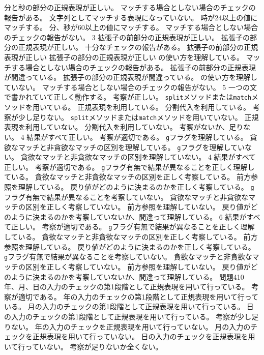 {{	{分と秒の部分の正規表現が正しい。}
	{マッチする場合としない場合のチェックの報告がある。}
	}
	{
  {文字列としてマッチする表現になっていない。}
	{時が24以上の値にマッチする。}
	{分、秒が60以上の値にマッチする。}
	{マッチする場合としない場合のチェックの報告がない。}
	}
	{}{3}
	{
	{拡張子の前部分の正規表現が正しい。}
	{拡張子の部分の正規表現が正しい。}
	{十分なチェックの報告がある。}
	}
	{
	{拡張子の前部分の正規表現が正しい}
	{拡張子の部分の正規表現が正しい}
	{{\bfseries\textdollar}の使い方を理解している。}
	{マッチする場合としない場合のチェックの報告がある。}
	}
	{
	{拡張子の前部分の正規表現が間違っている。}
	{拡張子の部分の正規表現が間違っている。}
	{{\bfseries\textdollar}の使い方を理解していない。}
	{マッチする場合としない場合のチェックの報告がない。}
	}
	{}{5}
	{
	{一つの文で書かれていて正しく動作する。}
	{考察が正しい。}
	}
	{
	{\texttt{split}メソッドまたは\texttt{match}メソッドを用いている。}
	{正規表現を利用している。}
	{分割代入を利用している。}
	{考察が少し足りない。}
	}
	{
	{\texttt{split}メソッドまたは\texttt{match}メソッドを用いていない。}
	{正規表現を利用していない。}
	{分割代入を利用していない。}
	{考察がないか、足りない。}
	}
	{}{4}
	{
	{結果がすべて正しい。}
  {考察が適切である。}
	}
	{
	{\texttt{g}フラグを理解している。}
  {貪欲なマッチと非貪欲なマッチの区別を理解している。}
	}
	{
	{\texttt{g}フラグを理解していない。}
  {貪欲なマッチと非貪欲なマッチの区別を理解していない。}
	}
	{}{4}
	{
	{結果がすべて正しい。}
  {考察が適切である。}
	}
	{
	{\texttt{g}フラグ有無で結果が異なることを正しく理解している。}
  {貪欲なマッチと非貪欲なマッチの区別を正しく考察している。}
  {前方参照を理解している。}
  {戻り値がどのように決まるのかを正しく考察している。}
	}
	{
	{\texttt{g}フラグ有無で結果が異なることを考察していない。}
  {貪欲なマッチと非貪欲なマッチの区別を正しく考察していない。}
  {前方参照を理解していない。}
  {戻り値がどのように決まるのかを考察していないか、間違って理解している。}
	}
	{}{6}
	{
	{結果がすべて正しい。}
  {考察が適切である。}
	}
	{
	{\texttt{g}フラグ有無で結果が異なることを正しく理解している。}
  {貪欲なマッチと非貪欲なマッチの区別を正しく考察している。}
  {前方参照を理解している。}
  {戻り値がどのように決まるのかを正しく考察している。}
	}
	{
	{\texttt{g}フラグ有無で結果が異なることを考察していない。}
  {貪欲なマッチと非貪欲なマッチの区別を正しく考察していない。}
  {前方参照を理解していない。}
  {戻り値がどのように決まるのかを考察していないか、間違って理解している。}
	}
	{問題4}{10}
	{
	{年、月、日の入力のチェックの第1段階として正規表現を用いて行っている。}
  {考察が適切である。}
	}
	{
	{年の入力のチェックの第1段階として正規表現を用いて行っている。}
	{月の入力のチェックの第1段階として正規表現を用いて行っている。}
	{日の入力のチェックの第1段階として正規表現を用いて行っている。}
  {考察が少し足りない。}
	}
	{
	{年の入力のチェックを正規表現を用いて行っていない。}
	{月の入力のチェックを正規表現を用いて行っていない。}
	{日の入力のチェックを正規表現を用いて行っていない。}
  {考察が足りないか全くない。}
	}
}